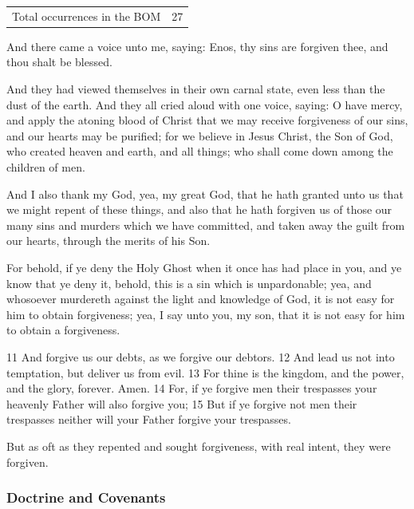 		\begin{tabular}{ll}
			Total occurrences in the BOM & 27
		\end{tabular}
		
		\begin{compactdesc}
			\item[Enos 1:5] And there came a voice unto me, saying: Enos, thy sins are forgiven thee, and thou shalt be blessed.
			\item[Mosiah 4:2] And they had viewed themselves in their own carnal state, even less than the dust of the earth. And they all cried aloud with one voice, saying: O have mercy, and apply the atoning blood of Christ that we may receive forgiveness of our sins, and our hearts may be purified; for we believe in Jesus Christ, the Son of God, who created heaven and earth, and all things; who shall come down among the children of men.
			\item[{\hyperref[MOSIAH-26-29]{Mosiah 26:29--31}}]
			\item[Alma 24:10] And I also thank my God, yea, my great God, that he hath granted unto us that we might repent of these things, and also that he hath forgiven us of those our many sins and murders which we have committed, and taken away the guilt from our hearts, through the merits of his Son.
			\item[Alma 39:6] For behold, if ye deny the Holy Ghost when it once has had place in you, and ye know that ye deny it, behold, this is a sin which is unpardonable; yea, and whosoever murdereth against the light and knowledge of God, it is not easy for him to obtain forgiveness; yea, I say unto you, my son, that it is not easy for him to obtain a forgiveness.
			\item[3 Nephi 13:11--15] 11 And forgive us our debts, as we forgive our debtors. 12 And lead us not into temptation, but deliver us from evil. 13 For thine is the kingdom, and the power, and the glory, forever. Amen. 14 For, if ye forgive men their trespasses your heavenly Father will also forgive you; 15 But if ye forgive not men their trespasses neither will your Father forgive your trespasses. 
			\item[Moroni 6:8] But as oft as they repented and sought forgiveness, with real intent, they were forgiven.
		\end{compactdesc}
		
	\subsubsection{Doctrine and Covenants} %
		\label{FORGIVENESS-DC}
	
